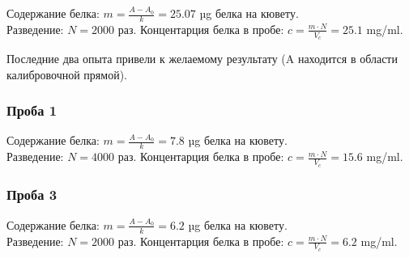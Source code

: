 \def\svgwidth{\linewidth}
Содержание белка: $ m = \frac{A-A_0}{k} = 25.07 $ µg белка на кювету. \\
Разведение: $ N = 2000 $ раз.
Концентарция белка в пробе: $ c = \frac{m \cdot N}{V_c} = 25.1 $ mg/ml.

Последние два опыта привели к желаемому результату
(A находится в области калибровочной прямой).

\subsubsection{Проба 1}
\def\svgwidth{\linewidth}
Содержание белка: $ m = \frac{A-A_0}{k} = 7.8 $ µg белка на кювету. \\
Разведение: $ N = 4000 $ раз.
Концентарция белка в пробе: $ c = \frac{m \cdot N}{V_c} = 15.6 $ mg/ml.

\subsubsection{Проба 3}
\def\svgwidth{\linewidth}
Содержание белка: $ m = \frac{A-A_0}{k} = 6.2 $ µg белка на кювету. \\
Разведение: $ N = 2000 $ раз.
Концентарция белка в пробе: $ c = \frac{m \cdot N}{V_c} = 6.2 $ mg/ml.

